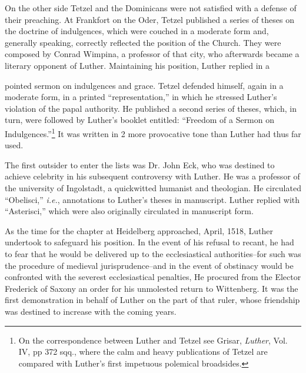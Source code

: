 On the other side Tetzel and the Dominicans were not satisfied
with a defense of their preaching. At Frankfort on the Oder, Tetzel
published a series of theses on the doctrine of indulgences, which
were couched in a moderate form and, generally speaking, correctly
reflected the position of the Church. They were composed by Conrad
Wimpina, a professor of that city, who afterwards became a literary
opponent of Luther. Maintaining his position, Luther replied in a

pointed sermon on indulgences and grace. Tetzel defended himself,
again in a moderate form, in a printed “representation,” in which
he stressed Luther’s violation of the papal authority. He published a
second series of theses, which, in turn, were followed by Luther’s
booklet entitled: “Freedom of a Sermon on Indulgences.”\footnote
{On the correspondence between Luther and Tetzel see Grisar, \textit{Luther}, Vol. IV, pp
372 sqq., where the calm and heavy publications of Tetzel are compared with Luther’s
first impetuous polemical broadsides.}
It was written in 2 more provocative tone than Luther had thus far used.

The first outsider to enter the lists was Dr. John Eck, who was
destined to achieve celebrity in his subsequent controversy with
Luther. He was a professor of the university of Ingolstadt, a quickwitted
humanist and theologian. He circulated “Obelisci,” \textit{i.e.}, annotations
to Luther’s theses in manuscript. Luther replied with
“Asterisci,” which were also originally circulated in manuscript
form.

As the time for the chapter at Heidelberg approached, April, 1518,
Luther undertook to safeguard his position. In the event of his refusal
to recant, he had to fear that he would be delivered up to the
ecclesiastical authorities--for such was the procedure of medieval
jurisprudence--and in the event of obstinacy would be confronted
with the severest ecclesiastical penalties, He procured from the
Elector Frederick of Saxony an order for his unmolested return to
Wittenberg. It was the first demonstration in behalf of Luther on the
part of that ruler, whose friendship was destined to increase with the
coming years.

